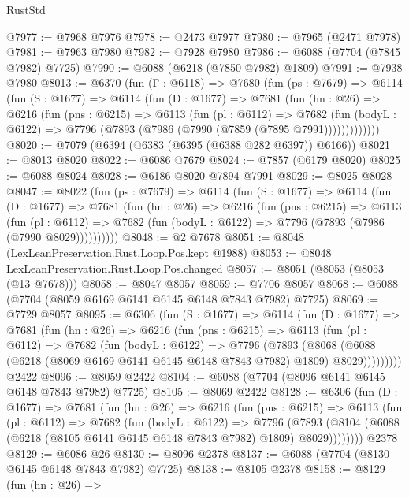 \begin{lexlean}{RustStd}
\begin{coremodule}
@7977 := @7968 @7976
@7978 := @2473 @7977
@7980 := @7965 (@2471 @7978)
@7981 := @7963 @7980
@7982 := @7928 @7980
@7986 := @6088 (@7704 (@7845 @7982) @7725)
@7990 := @6088 (@6218 (@7850 @7982) @1809)
@7991 := @7938 @7980
@8013 := @6370
    (fun (Γ : @6118) =>
    @7680
      (fun (ps : @7679) =>
      @6114
        (fun (S : @1677) =>
        @6114
          (fun (D : @1677) =>
          @7681
            (fun (hn : @26) =>
            @6216
              (fun (pns : @6215) =>
              @6113
                (fun (pl : @6112) =>
                @7682
                  (fun (bodyL : @6122) =>
                  @7796 (@7893 (@7986 (@7990 (@7859 (@7895 @7991)))))))))))))
@8020 := @7079 (@6394 (@6383 (@6395 (@6388 @282 @6397)) @6166))
@8021 := @8013 @8020
@8022 := @6086 @7679
@8024 := @7857 (@6179 @8020)
@8025 := @6088 @8024
@8028 := @6186 @8020 @7894 @7991
@8029 := @8025 @8028
@8047 := @8022
    (fun (ps : @7679) =>
    @6114
      (fun (S : @1677) =>
      @6114
        (fun (D : @1677) =>
        @7681
          (fun (hn : @26) =>
          @6216
            (fun (pns : @6215) =>
            @6113
              (fun (pl : @6112) =>
              @7682 (fun (bodyL : @6122) => @7796 (@7893 (@7986 (@7990 @8029))))))))))
@8048 := @2 @7678
@8051 := @8048 (LexLeanPreservation.Rust.Loop.Pos.kept @1988)
@8053 := @8048 LexLeanPreservation.Rust.Loop.Pos.changed
@8057 := @8051 (@8053 (@8053 (@13 @7678)))
@8058 := @8047 @8057
@8059 := @7706 @8057
@8068 := @6088 (@7704 (@8059 @6169 @6141 @6145 @6148 @7843 @7982) @7725)
@8069 := @7729 @8057
@8095 := @6306
    (fun (S : @1677) =>
    @6114
      (fun (D : @1677) =>
      @7681
        (fun (hn : @26) =>
        @6216
          (fun (pns : @6215) =>
          @6113
            (fun (pl : @6112) =>
            @7682
              (fun (bodyL : @6122) =>
              @7796
                (@7893
                  (@8068
                    (@6088 (@6218 (@8069 @6169 @6141 @6145 @6148 @7843 @7982) @1809) @8029)))))))))
    @2422
@8096 := @8059 @2422
@8104 := @6088 (@7704 (@8096 @6141 @6145 @6148 @7843 @7982) @7725)
@8105 := @8069 @2422
@8128 := @6306
    (fun (D : @1677) =>
    @7681
      (fun (hn : @26) =>
      @6216
        (fun (pns : @6215) =>
        @6113
          (fun (pl : @6112) =>
          @7682
            (fun (bodyL : @6122) =>
            @7796
              (@7893 (@8104 (@6088 (@6218 (@8105 @6141 @6145 @6148 @7843 @7982) @1809) @8029))))))))
    @2378
@8129 := @6086 @26
@8130 := @8096 @2378
@8137 := @6088 (@7704 (@8130 @6145 @6148 @7843 @7982) @7725)
@8138 := @8105 @2378
@8158 := @8129
    (fun (hn : @26) =>

\end{coremodule}
\end{lexlean}
